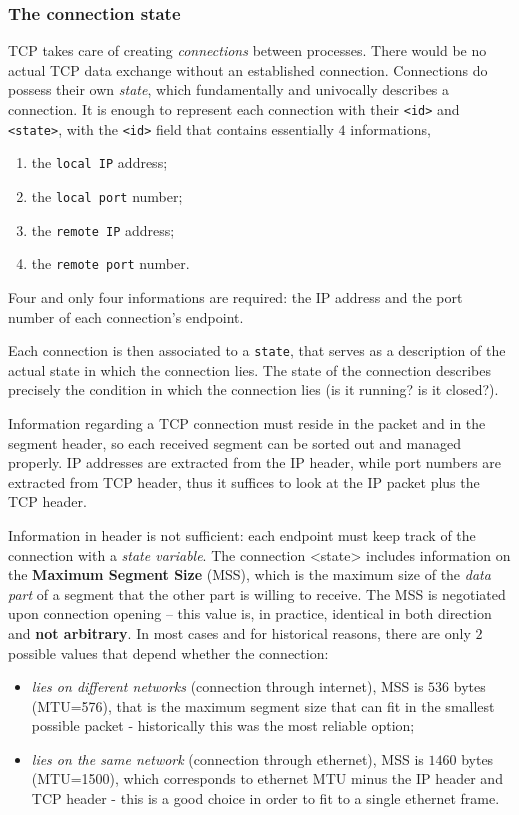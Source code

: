 \documentclass[10pt]{extbook}
\begin{document}
\subsubsection{The connection state}

TCP takes care of creating \emph{connections} between processes. There would be
no actual TCP data exchange without an established connection. Connections do
possess their own \emph{state}, which fundamentally and univocally describes a
connection. It is enough to represent each connection with their \texttt{<id>}
and \texttt{<state>}, with the \texttt{<id>} field that contains essentially
$4$ informations,
\begin{enumerate}
    \item the \texttt{local IP} address;
    \item the \texttt{local port} number;
    \item the \texttt{remote IP} address;
    \item the \texttt{remote port} number.
\end{enumerate}

Four and only four informations are required: the IP address and the
port number of each connection's endpoint.

Each connection is then associated to a \texttt{state}, that serves as a
description of the actual state in which the connection lies. The state of the
connection describes precisely the condition in which the connection lies (is
it running? is it closed?).

Information regarding a TCP connection must reside in the packet and in the segment
header, so each received segment can be sorted out and managed properly. IP
addresses are extracted from the IP header, while port numbers are extracted
from TCP header, thus it suffices to look at the IP packet plus the TCP header.

Information in header is not sufficient: each endpoint must keep track of the
connection with a \emph{state variable}. The connection <state> includes
information on the \textbf{Maximum Segment Size} (MSS), which is the maximum
size of the \emph{data part} of a segment that the other part is willing to
receive. The MSS is negotiated upon connection opening \--- this value is, in
practice, identical in both direction and \textbf{not arbitrary}. In most
cases and for historical reasons, there are only $2$ possible values that
depend whether the connection:

\begin{itemize}
    \item \emph{lies on different networks} (connection through internet), MSS
        is $536$ bytes (MTU=576), that is the maximum segment size that can fit
        in the smallest possible packet \-- historically this was the most
        reliable option;
    \item \emph{lies on the same network} (connection through ethernet), MSS is
        $1460$ bytes (MTU=1500), which corresponds to ethernet MTU minus the IP
        header and TCP header \-- this is a good choice in order to fit to a
        single ethernet frame.
\end{itemize}
\end{document}
